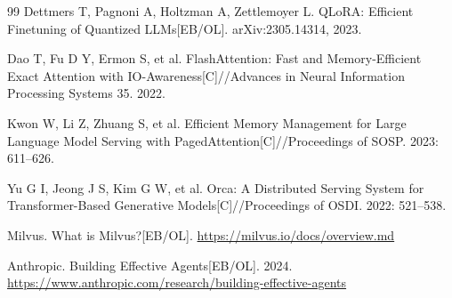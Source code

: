 \documentclass{article}
\begin{document}
\begin{thebibliography}{99}
 Dettmers T, Pagnoni A, Holtzman A, Zettlemoyer L. QLoRA: Efficient Finetuning of Quantized LLMs[EB/OL]. arXiv:2305.14314, 2023.

 Dao T, Fu D Y, Ermon S, et al. FlashAttention: Fast and Memory-Efficient Exact Attention with IO-Awareness[C]//Advances in Neural Information Processing Systems 35. 2022.

 Kwon W, Li Z, Zhuang S, et al. Efficient Memory Management for Large Language Model Serving with PagedAttention[C]//Proceedings of SOSP. 2023: 611--626.

 Yu G I, Jeong J S, Kim G W, et al. Orca: A Distributed Serving System for Transformer-Based Generative Models[C]//Proceedings of OSDI. 2022: 521--538.

 Milvus. What is Milvus?[EB/OL]. \url{https://milvus.io/docs/overview.md}

 Anthropic. Building Effective Agents[EB/OL]. 2024. \url{https://www.anthropic.com/research/building-effective-agents}

\end{thebibliography}
\end{document}

